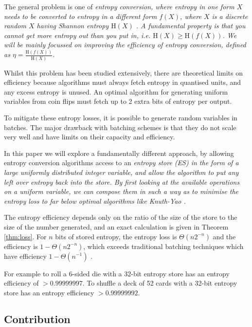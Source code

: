 \documentclass[lettersize,journal]{IEEEtran}
\newcommand{\Entropy}{\mathrm{H}}
\newcommand{\entropy}[1]{\Entropy(#1)}
\begin{document}
The general problem is one of \em entropy conversion\em, where entropy in one form $X$ needs to be converted to entropy in a different form $f(X)$, where $X$ is a discrete random $X$ having Shannon entropy $\entropy{X}$
\cite{shannon1948mathematical}.  
A fundamental property is that you cannot get more entropy out than you put in, i.e. $\entropy{X} \ge \entropy{f(X)}$. \cite{cover1999elements} 
We will be mainly focussed on improving the \em efficiency \em of entropy conversion, defined as $\eta = \frac{\entropy{f(X)}}{\entropy{X}}$.

Whilst this problem has been studied extensively, there are theoretical limits on efficiency because algorithms must always fetch entropy in quantised units, and any excess entropy is unused. An optimal algorithm for generating uniform variables from coin flips must fetch up to 2 extra bits of entropy per output.  \cite{knuth1976complexity}

To mitigate these entropy losses, it is possible to generate random variables in batches. The major drawback with batching schemes is that they do not scale very well and have limits on their capacity and efficiency.

In this paper we will explore a fundamentally different approach, by allowing entropy conversion algorithms access to an \em entropy store \em (ES) in the form of a large uniformly distributed integer variable, and allow the algorithm to put any left over entropy back into the store. By first looking at the available operations on a uniform variable, we can compose them in such a way as to minimise the entropy loss to far below optimal algorithms like Knuth-Yao \cite{knuth1976complexity}.

The entropy efficiency depends only on the ratio of the size of the store to the size of the number generated, and an exact calculation is given in Theorem \ref{thm:loss}. For $n$ bits of stored entropy, the entropy loss is $\Theta(n2^{-n})$ and the efficiency is $1-\Theta(n2^{-n})$, which exceeds traditional batching techniques which have efficiency $1-\Theta(n^{-1})$ \cite{kozen2022}.

For example to roll a 6-sided die with a 32-bit entropy store has an entropy efficiency of $>0.99999997$. To shuffle a deck of 52 cards with a 32-bit entropy store has an entropy efficiency $>0.99999992$.

\subsection {Contribution}
\end{document}
